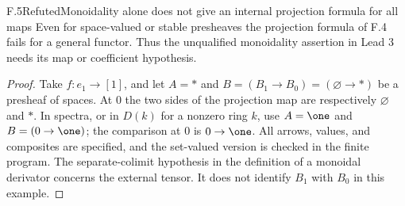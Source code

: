 \begin{claim}{F.5}{Refuted}{Monoidality alone does not give an internal projection formula for all maps}
Even for space-valued or stable presheaves the projection formula of F.4 fails for a general functor. Thus the unqualified monoidality assertion in Lead 3 needs its map or coefficient hypothesis.
\end{claim}
\begin{proof}
Take $f:e_1\to[1]$, and let $A=*$ and $B=(B_1\to B_0)=(\varnothing\to *)$ be a presheaf of spaces. At $0$ the two sides of the projection map are respectively $\varnothing$ and $*$. In spectra, or in $D(k)$ for a nonzero ring $k$, use $A=\one$ and $B=(0\to\one)$; the comparison at $0$ is $0\to\one$. All arrows, values, and composites are specified, and the set-valued version is checked in the finite program. The separate-colimit hypothesis in the definition of a monoidal derivator concerns the external tensor. It does not identify $B_1$ with $B_0$ in this example.
\end{proof}

